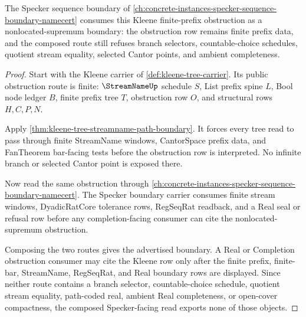 The Specker sequence boundary of \autoref{ch:concrete-instances-specker-sequence-boundary-namecert} consumes this Kleene finite-prefix obstruction as a nonlocated-supremum boundary: the obstruction row remains finite prefix data, and the composed route still refuses branch selectors, countable-choice schedules, quotient stream equality, selected Cantor points, and ambient completeness.

\begin{proof}
Start with the Kleene carrier of \autoref{def:kleene-tree-carrier}. Its public obstruction route is finite: $\StreamNameUp$ schedule $S$, List prefix spine $L$, Bool node ledger $B$, finite prefix tree $T$, obstruction row $O$, and structural rows $H,C,P,N$.

Apply \autoref{thm:kleene-tree-streamname-path-boundary}. It forces every tree read to pass through finite StreamName windows, CantorSpace prefix data, and FanTheorem bar-facing tests before the obstruction row is interpreted. No infinite branch or selected Cantor point is exposed there.

Now read the same obstruction through \autoref{ch:concrete-instances-specker-sequence-boundary-namecert}. The Specker boundary carrier consumes finite stream windows, DyadicRatCore tolerance rows, RegSeqRat readback, and a Real seal or refusal row before any completion-facing consumer can cite the nonlocated-supremum obstruction.

Composing the two routes gives the advertised boundary. A Real or Completion obstruction consumer may cite the Kleene row only after the finite prefix, finite-bar, StreamName, RegSeqRat, and Real boundary rows are displayed. Since neither route contains a branch selector, countable-choice schedule, quotient stream equality, path-coded real, ambient Real completeness, or open-cover compactness, the composed Specker-facing read exports none of those objects.
\end{proof}

